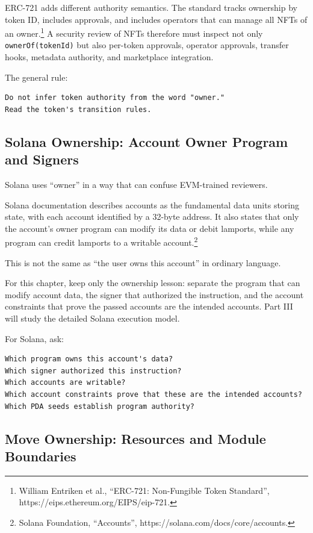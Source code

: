 ERC-721 adds different authority semantics. The standard tracks
ownership by token ID, includes approvals, and includes operators that
can manage all NFTs of an owner.\footnote{William Entriken et al.,
  ``ERC-721: Non-Fungible Token Standard'',
  https://eips.ethereum.org/EIPS/eip-721.} A security review of NFTs
therefore must inspect not only
\passthrough{\lstinline!ownerOf(tokenId)!} but also per-token approvals,
operator approvals, transfer hooks, metadata authority, and marketplace
integration.

The general rule:

\begin{lstlisting}
Do not infer token authority from the word "owner."
Read the token's transition rules.
\end{lstlisting}

\subsection{Solana Ownership: Account Owner Program and Signers}

Solana uses ``owner'' in a way that can confuse EVM-trained reviewers.

Solana documentation describes accounts as the fundamental data units
storing state, with each account identified by a 32-byte address. It
also states that only the account's owner program can modify its data or
debit lamports, while any program can credit lamports to a writable
account.\footnote{Solana Foundation, ``Accounts'',
  https://solana.com/docs/core/accounts.}

This is not the same as ``the user owns this account'' in ordinary
language.

For this chapter, keep only the ownership lesson: separate the program
that can modify account data, the signer that authorized the
instruction, and the account constraints that prove the passed accounts
are the intended accounts. Part III will study the detailed Solana
execution model.

For Solana, ask:

\begin{lstlisting}
Which program owns this account's data?
Which signer authorized this instruction?
Which accounts are writable?
Which account constraints prove that these are the intended accounts?
Which PDA seeds establish program authority?
\end{lstlisting}

\subsection{Move Ownership: Resources and Module Boundaries}

